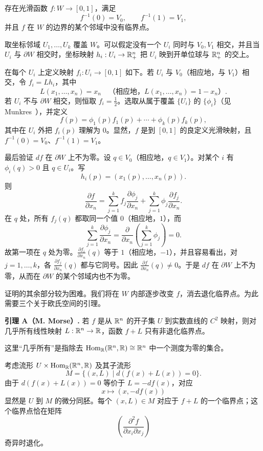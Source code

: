 \label{proof:2-5-start}存在光滑函数 $f:W\to[0,1]$，满足
\[
  f^{-1}(0)=V_0,\qquad f^{-1}(1)=V_1,
\]
并且 $f$ 在 $W$ 的边界的某个邻域中没有临界点。

\Proof 取坐标邻域 $U_1,\ldots,U_k$ 覆盖 $W$。可以假定没有一个 $U_i$ 同时与 $V_0,V_1$ 相交，并且当 $U_i$ 与 $\partial W$ 相交时，坐标映射 $h_i:U_i\to\mathbb{R}^n_+$ 把 $U_i$ 映到开单位球与 $\mathbb{R}^n_+$ 的交上。

在每个 $U_i$ 上定义映射 $f_i:U_i\to[0,1]$ 如下。若 $U_i$ 与 $V_0$（相应地，与 $V_1$）相交，令 $f_i=Lh_i$，其中
\[
  L(x_1,\ldots,x_n)=x_n
  \quad\text{（相应地，$L(x_1,\ldots,x_n)=1-x_n$）}.
\]
若 $U_i$ 不与 $\partial W$ 相交，则恒取 $f_i=\tfrac12$。选取从属于覆盖 $\{U_i\}$ 的 $\{\phi_i\}$（见 Munkres~\cite[p.~18]{ref05}），并定义
\[
  f(p)=\phi_1(p)f_1(p)+\cdots+\phi_k(p)f_k(p),
\]
其中在 $U_i$ 外把 $f_i(p)$ 理解为 $0$。显然，$f$ 是到 $[0,1]$ 的良定义光滑映射，且 $f^{-1}(0)=V_0$、$f^{-1}(1)=V_1$。

最后验证 $df$ 在 $\partial W$ 上不为零。设 $q\in V_0$（相应地，$q\in V_1$）。对某个 $i$ 有 $\phi_i(q)>0$ 且 $q\in U_i$。写
\[
  h_i(p)=(x_1(p),\ldots,x_n(p)).
\]
则
\[
\frac{\partial f}{\partial x_n}
=\sum_{j=1}^k f_j\frac{\partial\phi_j}{\partial x_n}
+\sum_{j=1}^k\phi_j\frac{\partial f_j}{\partial x_n}.
\]
在 $q$ 处，所有 $f_j(q)$ 都取同一个值 $0$（相应地，$1$），而
\[
  \sum_{j=1}^k\frac{\partial\phi_j}{\partial x_n}
  =\frac{\partial}{\partial x_n}\left(\sum_{j=1}^k\phi_j\right)=0.
\]
故第一项在 $q$ 处为零。$\frac{\partial f_i}{\partial x_n}(q)$ 等于 $1$（相应地，$-1$），并且容易看出，对 $j=1,\ldots,k$，各 $\frac{\partial f_j}{\partial x_n}(q)$ 都与它同号。因此 $\frac{\partial f}{\partial x_n}(q)\neq0$。于是 $df$ 在 $\partial W$ 上不为零，从而在 $\partial W$ 的某个邻域内也不为零。
\EndProof

证明的其余部分较为困难。我们将在 $W$ 内部逐步改变 $f$，消去退化临界点。为此需要三个关于欧氏空间的引理。

\par\medskip\noindent{}\label{lem:2-A}\textbf{引理 A（M. Morse）.}\quad
若 $f$ 是从 $\mathbb{R}^n$ 的开子集 $U$ 到实数直线的 $C^2$ 映射，则对几乎所有线性映射 $L:\mathbb{R}^n\to\mathbb{R}$，函数 $f+L$ 只有非退化临界点。

这里“几乎所有”是指除去 $\operatorname{Hom}_{\mathbb{R}}(\mathbb{R}^n,\mathbb{R})\cong\mathbb{R}^n$ 中一个测度为零的集合。

\Proof 考虑流形 $U\times\operatorname{Hom}_{\mathbb{R}}(\mathbb{R}^n,\mathbb{R})$ 及其子流形
\[
  M=\{(x,L)\mid d(f(x)+L(x))=0\}.
\]
由于 $d(f(x)+L(x))=0$ 等价于 $L=-df(x)$，对应
\[
  x\longmapsto(x,-df(x))
\]
显然是 $U$ 到 $M$ 的微分同胚。每个 $(x,L)\in M$ 对应于 $f+L$ 的一个临界点；这个临界点恰在矩阵
\[
  \left(\frac{\partial^2f}{\partial x_i\partial x_j}\right)
\]
奇异时退化。

